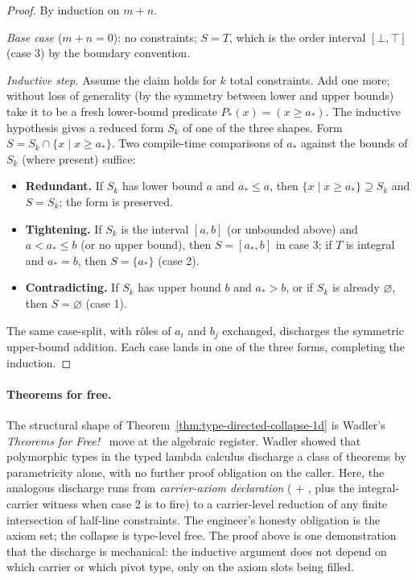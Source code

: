 \documentclass[11pt, a4paper]{article}
\begin{document}
\begin{proof}
By induction on $m + n$.

\smallskip
\noindent\emph{Base case} ($m + n = 0$): no constraints; $S = T$,
which is the order interval $[\bot, \top]$ (case 3) by the boundary
convention.

\smallskip
\noindent\emph{Inductive step.} Assume the claim holds for $k$ total
constraints. Add one more; without loss of generality (by the
symmetry between lower and upper bounds) take it to be a fresh
lower-bound predicate $P_*(x) = (x \ge a_*)$. The inductive
hypothesis gives a reduced form $S_k$ of one of the three shapes.
Form $S = S_k \cap \{x \mid x \ge a_*\}$. Two compile-time
comparisons of $a_*$ against the bounds of $S_k$ (where present)
suffice:

\begin{itemize}
  \item \textbf{Redundant.} If $S_k$ has lower bound $a$ and
        $a_* \le a$, then $\{x \mid x \ge a_*\} \supseteq S_k$ and
        $S = S_k$; the form is preserved.
  \item \textbf{Tightening.} If $S_k$ is the interval $[a, b]$ (or
        unbounded above) and $a < a_* \le b$ (or no upper bound),
        then $S = [a_*, b]$ in case 3; if $T$ is integral and
        $a_* = b$, then $S = \{a_*\}$ (case 2).
  \item \textbf{Contradicting.} If $S_k$ has upper bound $b$ and
        $a_* > b$, or if $S_k$ is already $\varnothing$, then
        $S = \varnothing$ (case 1).
\end{itemize}

\noindent
The same case-split, with rôles of $a_i$ and $b_j$ exchanged,
discharges the symmetric upper-bound addition. Each case lands in
one of the three forms, completing the induction.
\end{proof}

\paragraph{Theorems for free.}
The structural shape of Theorem~\ref{thm:type-directed-collapse-1d}
is Wadler's \emph{Theorems for Free!}~\cite{wadler1989theorems}
move at the algebraic register. Wadler showed that polymorphic
types in the typed lambda calculus discharge a class of theorems by
parametricity alone, with no further proof obligation on the
caller. Here, the analogous discharge runs from \emph{carrier-axiom
declaration} ( +
, plus the integral-carrier
witness when case 2 is to fire) to a carrier-level reduction of any
finite intersection of half-line constraints. The engineer's
honesty obligation is the axiom set; the collapse is
type-level free. The proof above is one demonstration that the
discharge is mechanical: the inductive argument does not depend on
which carrier or which pivot type, only on the axiom slots being
filled.
\end{document}
